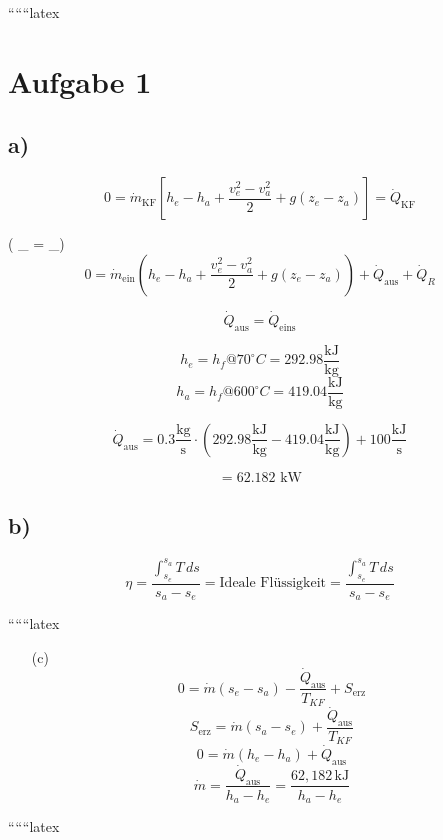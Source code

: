 
``````latex


\section*{Aufgabe 1}

\subsection*{a)}

\[
0 = \dot{m}_{\text{KF}} \left[ h_e - h_a + \frac{v_e^2 - v_a^2}{2} + g (z_e - z_a) \right] = \dot{Q}_{\text{KF}}
\]

 \quad ( _{} = _{})
\[
0 = \dot{m}_{\text{ein}} \left( h_e - h_a + \frac{v_e^2 - v_a^2}{2} + g (z_e - z_a) \right) + \dot{Q}_{\text{aus}} + \dot{Q}_R
\]

\[
\dot{Q}_{\text{aus}} = \dot{Q}_{\text{eins}}
\]

\[
h_e = h_f @ 70^\circ C = 292.98 \frac{\text{kJ}}{\text{kg}}
\]
\[
h_a = h_f @ 600^\circ C = 419.04 \frac{\text{kJ}}{\text{kg}}
\]

\[
\dot{Q}_{\text{aus}} = 0.3 \frac{\text{kg}}{\text{s}} \cdot \left( 292.98 \frac{\text{kJ}}{\text{kg}} - 419.04 \frac{\text{kJ}}{\text{kg}} \right) + 100 \frac{\text{kJ}}{\text{s}}
\]

\[
= 62.182 \text{ kW}
\]

\subsection*{b)}

\[
\eta = \frac{\int_{s_e}^{s_a} T \, ds}{s_a - s_e} = \text{Ideale Flüssigkeit} = \frac{\int_{s_e}^{s_a} T \, ds}{s_a - s_e}
\]

``````latex


\begin{itemize}
    \item[(c)] 
    \begin{equation*}
        0 = \dot{m} (s_{e} - s_{a}) - \frac{\dot{Q}_{\text{aus}}}{T_{KF}} + S_{\text{erz}}
    \end{equation*}
    \begin{equation*}
        S_{\text{erz}} = \dot{m} (s_{a} - s_{e}) + \frac{\dot{Q}_{\text{aus}}}{T_{KF}}
    \end{equation*}
    \begin{equation*}
        0 = \dot{m} (h_{e} - h_{a}) + \dot{Q}_{\text{aus}}
    \end{equation*}
    \begin{equation*}
        \dot{m} = \frac{\dot{Q}_{\text{aus}}}{h_{a} - h_{e}} = \frac{62,182 \, \text{kJ}}{h_{a} - h_{e}}
    \end{equation*}
\end{itemize}

``````latex


